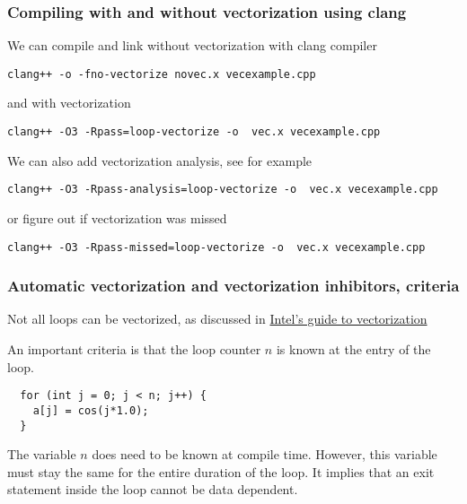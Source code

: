 \documentclass{beamer}
\begin{document}
\begin{frame}
\frametitle{Compiling with and without vectorization using clang}

We can compile and link without vectorization with clang compiler


\begin{verbatim}
clang++ -o -fno-vectorize novec.x vecexample.cpp

\end{verbatim}

and with vectorization


\begin{verbatim}
clang++ -O3 -Rpass=loop-vectorize -o  vec.x vecexample.cpp 

\end{verbatim}

We can also add vectorization analysis, see for example


\begin{verbatim}
clang++ -O3 -Rpass-analysis=loop-vectorize -o  vec.x vecexample.cpp 

\end{verbatim}

or figure out if vectorization was missed


\begin{verbatim}
clang++ -O3 -Rpass-missed=loop-vectorize -o  vec.x vecexample.cpp 

\end{verbatim}
\end{frame}

\begin{frame}
\frametitle{Automatic vectorization and vectorization inhibitors, criteria}

Not all loops can be vectorized, as discussed in \href{{https://software.intel.com/en-us/articles/a-guide-to-auto-vectorization-with-intel-c-compilers}}{Intel's guide to vectorization}

An important criteria is that the loop counter $n$ is known at the entry of the loop.




\begin{verbatim}
  for (int j = 0; j < n; j++) {
    a[j] = cos(j*1.0);
  }

\end{verbatim}

The variable $n$ does need to be known at compile time. However, this variable must stay the same for the entire duration of the loop. It implies that an exit statement inside the loop cannot be data dependent.
\end{frame}
\end{document}
